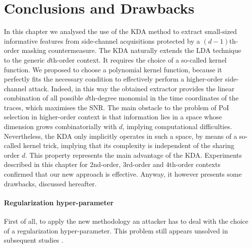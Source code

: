 \section{Conclusions and Drawbacks}\label{sec:KDAdrawbacks}
In this chapter we analysed the use of the KDA method to extract small-sized informative features from side-channel acquisitions protected by a $(d-1)$th-order masking countermeasure. The KDA naturally extends  the LDA technique to the generic $d$th-order context. It requires the choice of a so-called kernel function. We proposed to choose a polynomial kernel function, because it perfectly fits the necessary condition to effectively perform a  higher-order side-channel attack. Indeed, in this way the obtained extractor  provides the linear combination of all possible $d$th-degree monomial in the time coordinates of the traces, which maximises the SNR.  The main obstacle to the problem of PoI selection in higher-order context is that information lies in a space whose dimension grows combinatorially with $d$, implying computational difficulties. Nevertheless, the KDA only implicitly operates in such a space, by means of a so-called kernel trick, implying that its complexity is independent of the sharing order $d$. This property represents the main advantage of the KDA. Experiments described in this chapter for $2$nd-order, $3$rd-order and $4$th-order contexts confirmed that our new approach is effective. Anyway, it however presents some drawbacks, discussed hereafter. 

\paragraph*{Regularization hyper-parameter} First of all, to apply the new methodology an attacker has to deal with the choice of a regularization hyper-parameter. This problem still appears unsolved in subsequent studies \cite{zhou2017novel}. 
